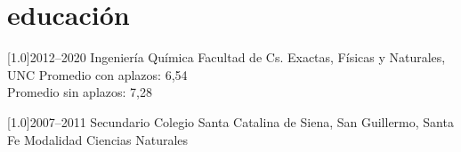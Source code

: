 \documentclass[espanol]{cv-style}     %
\begin{document}


\section{educación}
\begin{entrylist}

\entry
{\scalebox{.8}[1.0]{2012--2020}}
{Ingeniería Química}
{Facultad de Cs. Exactas, Físicas y Naturales, UNC}
{
\noindent Promedio con aplazos: 6,54\\
Promedio sin aplazos: 7,28\\
}

\entry
{\scalebox{.8}[1.0]{2007--2011}}
{Secundario}
{Colegio Santa Catalina de Siena, San Guillermo, Santa Fe}
{Modalidad Ciencias Naturales}

\end{entrylist}

\end{document}
